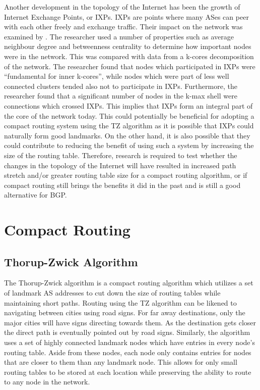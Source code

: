 \documentclass{dissertation/mpaper}
\begin{document}
Another development in the topology of the Internet has been the growth of Internet Exchange Points, or IXPs. IXPs are points where many ASes can peer with each other freely and exchange traffic. Their impact on the network was examined by \cite{gregori}. The researcher used a number of properties such as average neighbour degree and betweenness centrality to determine how important nodes were in the network. This was compared with data from a k-cores decomposition of the network. The researcher found that nodes which participated in IXPs were ``fundamental for inner k-cores'', while nodes which were part of less well connected clusters tended also not to participate in IXPs. Furthermore, the researcher found that a significant number of nodes in the k-max shell were connections which crossed IXPs. This implies that IXPs form an integral part of the core of the network today. This could potentially be beneficial for adopting a compact routing system using the TZ algorithm as it is possible that IXPs could naturally form good landmarks. On the other hand, it is also possible that they could contribute to reducing the benefit of using such a system by increasing the size of the routing table. Therefore, research is required to test whether the changes in the topology of the Internet will have resulted in increased path stretch and/or greater routing table size for a compact routing algorithm, or if compact routing still brings the benefits it did in the past and is still a good alternative for BGP. 

\section{Compact Routing}
\subsection{Thorup-Zwick Algorithm}

The Thorup-Zwick algorithm \cite{thorup} is a compact routing algorithm which utilizes a set of landmark AS addresses to cut down the size of routing tables while maintaining short paths. Routing using the TZ algorithm can be likened to navigating between cities using road signs. For far away destinations, only the major cities will have signs directing towards them. As the destination gets closer the direct path is eventually pointed out by road signs. Similarly, the algorithm uses a set of highly connected landmark nodes which have entries in every node's routing table. Aside from these nodes, each node only contains entries for nodes that are closer to them than any landmark node. This allows for only small routing tables to be stored at each location while preserving the ability to route to any node in the network.
\end{document}
